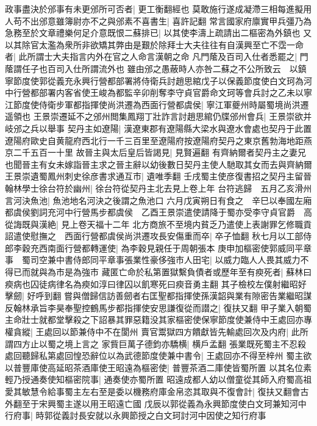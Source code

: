 政事盡決於邠事有未更邠所可否者|{
	更工衡翻經也}
莫敢施行遂成凝滯三相每進擬用人苟不出邠意雖簿尉亦不之與邠素不喜書生|{
	喜許記翻}
常言國家府廪實甲兵彊乃為急務至於文章禮樂何足介意既恨二蘇排已|{
	以其使李濤上疏請出二樞密為外鎮也}
又以其除官太濫為衆所非欲矯其弊由是艱於除拜士大夫往往有自漢興至亡不霑一命者|{
	此所謂士大夫指言内外在官之人命言漢朝之命}
凡門䕃及百司入仕者悉罷之|{
	門䕃謂任子也百司入仕所謂流外也}
雖由邠之愚蔽時人亦咎二蘇之不公所致云　以鎮寧節度使郭從義充永興行營都部署將侍衛兵討趙思綰戊子以保義節度使白文珂為河中行營都部署内客省使王峻為都監辛卯削奪李守貞官爵命文珂等會兵討之乙未以寧江節度使侍衛步軍都指揮使尚洪遷為西面行營都虞侯|{
	寧江軍夔州時屬蜀境尚洪遷遥領也}
王景崇遷延不之邠州閲集鳳翔丁壯詐言討趙思綰仍牒邠州會兵|{
	王景崇欲并岐邠之兵以舉事}
契丹主如遼陽|{
	漢遼東郡有遼陽縣大梁水與遼水會處也契丹于此置遼陽府歐史自黄龍府西北行一千三百里至遼陽府按遼陽府契丹之東京舊勃海地距燕京二千五百一十里}
故晉主與太后皇后皆謁見|{
	見賢遍翻}
有齊納爾者契丹主之妻兄也聞晉主有女未嫁詣晉主求之晉主辭以幼後數日契丹主使人馳取其女而去與齊納爾　王景崇遺蜀鳳州刺史徐彦書求通互市|{
	遺唯季翻}
壬戌蜀主使彦復書招之契丹主留晉翰林學士徐台符於幽州|{
	徐台符從契丹主北去見上卷上年}
台符逃歸　五月乙亥滑州言河決魚池|{
	魚池地名河決之後謂之魚池口}
六月戊寅朔日有食之　辛巳以奉國左廂都虞侯劉詞充河中行營馬步都虞侯　乙酉王景崇遣使請降于蜀亦受李守貞官爵　高從誨既與漢絶|{
	見上卷天福十二年}
北方商旅不至境内貧乏乃遣使上表謝罪乞修職貢詔遣使慰撫之　西面行營都虞侯尚洪遷攻長安傷重而卒|{
	卒子恤翻}
秋七月以工部侍郎李穀充西南面行營都轉運使|{
	為李穀見親任于周朝張本}
庚申加樞密使郭威同平章事　蜀司空兼中書侍郎同平章事張業性豪侈強市人田宅|{
	以威力臨人人畏其威力不得已而就與為市是為強市}
藏匿亡命於私第置獄繫負債者或歷年至有瘐死者|{
	蘇林曰瘐病也囚徒病律名為瘐如淳曰律囚以飢寒死曰瘐音勇主翻}
其子檢校左僕射繼昭好擊劒|{
	好呼到翻}
嘗與僧歸信訪善劒者右匡聖都指揮使孫漢韶與業有隙密告業繼昭謀反翰林承旨李昊奉聖控鶴馬步都指揮使安思謙復從而譛之|{
	復扶又翻}
甲子業入朝蜀主命壯士就都堂擊殺之下詔暴其罪惡籍没其家樞密使保寧節度使兼侍中王處回亦專權貪縱|{
	王處回以節兼侍中不在閬州}
賣官鬻獄四方饋獻皆先輸處回次及内府|{
	此所謂四方止以蜀之境上言之}
家貲巨萬子德鈞亦驕横|{
	横戶孟翻}
張業既死蜀主不忍殺處回聽歸私第處回惶恐辭位以為武德節度使兼中書令|{
	王處回亦不得至梓州}
蜀主欲以普豐庫使高延昭茶酒庫使王昭遠為樞密使|{
	普豐茶酒二庫使皆蜀所置}
以其名位素輕乃授通奏使知樞密院事|{
	通奏使亦蜀所置}
昭遠成都人幼以僧童從其師入府蜀高祖愛其敏慧令給事蜀主左右至是委以機務府庫金帛恣其取與不復會計|{
	復扶又翻會古外翻至于宋興蜀主遂以用王昭遠亡國}
戊辰以郭從義為永興節度使白文珂兼知河中行府事|{
	時郭從義討長安就以永興節授之白文珂討河中因使之知行府事}
